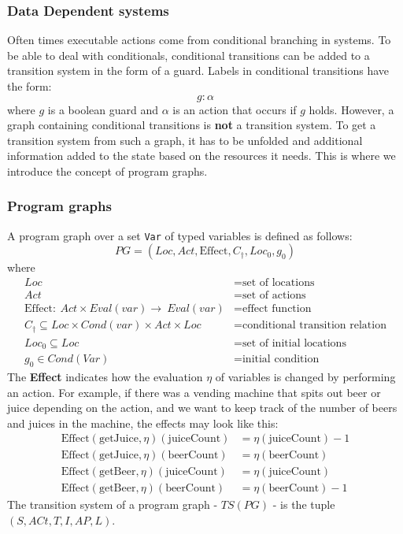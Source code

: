 \documentclass[11pt]{article}
\begin{document}
\subsubsection{Data Dependent systems}
Often times executable actions come from conditional branching in systems. To be able to deal with conditionals, conditional transitions can be added to a transition system in the form of a guard. Labels in conditional transitions have the form:
\begin{equation*}
g:\alpha
\end{equation*}
where $g$ is a boolean guard and $\alpha$ is an action that occurs if $g$ holds.
\n
However, a graph containing conditional transitions is \textbf{not} a transition system. To get a transition system from such a graph, it has to be unfolded and additional information added to the state based on the resources it needs. This is where we introduce the concept of program graphs.
\subsubsection{Program graphs}
A program graph over a set \texttt{Var} of typed variables is defined as follows:
\begin{equation}
PG = (Loc, Act, \text{Effect}, C_{\dagger}, Loc_{0}, g_{0})
\end{equation}
where
\begin{align*}
Loc &= \text{set of locations} \\
Act &= \text{set of actions} \\
\text{Effect}:\ Act \times Eval(var) \rightarrow\ Eval(var) &= \text{effect function} \\
C_{\dagger} \subseteq Loc \times Cond(var) \times Act \times Loc &= \text{conditional transition relation} \\
Loc_{0} \subseteq Loc &= \text{set of initial locations} \\
g_{0}\in Cond(Var) &= \text{initial condition}
\end{align*}
\noindent
The \textbf{Effect} indicates how the evaluation $\eta$ of variables is changed by performing an action. For example, if there was a vending machine that spits out beer or juice depending on the action, and we want to keep track of the number of beers and juices in the machine, the effects may look like this:
\begin{align*}
\text{Effect}(\text{getJuice}, \eta)(\text{juiceCount}) &= \eta(\text{juiceCount}) - 1 \\ 
\text{Effect}(\text{getJuice}, \eta)(\text{beerCount}) &= \eta(\text{beerCount}) \\
\text{Effect}(\text{getBeer}, \eta)(\text{juiceCount}) &= \eta(\text{juiceCount}) \\ 
\text{Effect}(\text{getBeer}, \eta)(\text{beerCount}) &= \eta(\text{beerCount}) - 1
\end{align*}
\noindent
The transition system of a program graph - $TS(PG)$ - is the tuple $(S, ACt, T, I, AP, L)$.
\end{document}

